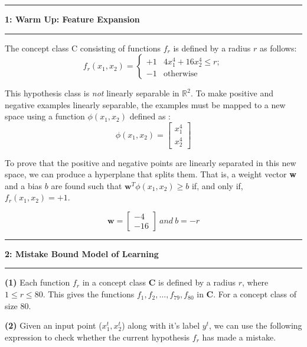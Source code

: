 \documentclass[11pt]{article}
\newcommand\question[2]{\vspace{.25in}\hrule\textbf{#1: #2}\vspace{.5em}\hrule\vspace{.10in}}
\renewcommand\part[1]{\vspace{.10in}\textbf{(#1)}}
\begin{document}
\raggedright
\newcommand\NAME{Jake Pitkin}  %
\newcommand\UID{u0891770}     %
\newcommand\HWNUM{2}              %

\question{1}{Warm Up: Feature Expansion}
The concept class C consisting of functions $f_r$ is defined by a radius $r$ as follows:
$$f_r(x_1, x_2) =
\left\{
	\begin{array}{ll}
		+1  & 4x_1^4 + 16x_2^4 \leq r; \\
		-1 & \mbox{otherwise}
	\end{array}
\right.$$

This hypothesis class is \textit{not} linearly separable in $\mathbb{R}^2$. To make positive and negative examples linearly separable, the examples must be mapped to a new space using a function $\phi(x_1, x_2)$ defined as :
$$\phi(x_1, x_2) = \begin{bmatrix}
    x_{1}^4\\
    x_{2}^4
\end{bmatrix}$$

To prove that the positive and negative points are linearly separated in this new space, we can produce a hyperplane that splits them. That is, a weight vector \textbf{w} and a bias $b$ are found such that $\mathbf{w}^T \phi(x_1, x_2) \geq b$ if, and only if, $f_r(x_1, x_2) = +1$.

$$\mathbf{w} = \begin{bmatrix} -4 \\ -16 \end{bmatrix} \ and \ b = -r$$ 

\question{2}{Mistake Bound Model of Learning}

\part{1} Each function $f_r$ in a concept class $\mathbf{C}$ is defined by a radius $r$, where $1 \leq r \leq 80$. This gives  the functions $f_1, f_2, ..., f_{79}, f_{80}$ in $\mathbf{C}$. For a concept class of size 80.


\part{2} Given an input point ($x_1^t, x_2^t$) along with it's label $y^t$, we can use the following expression to check whether the current hypothesis $f_r$ has made a mistake.
\end{document}

